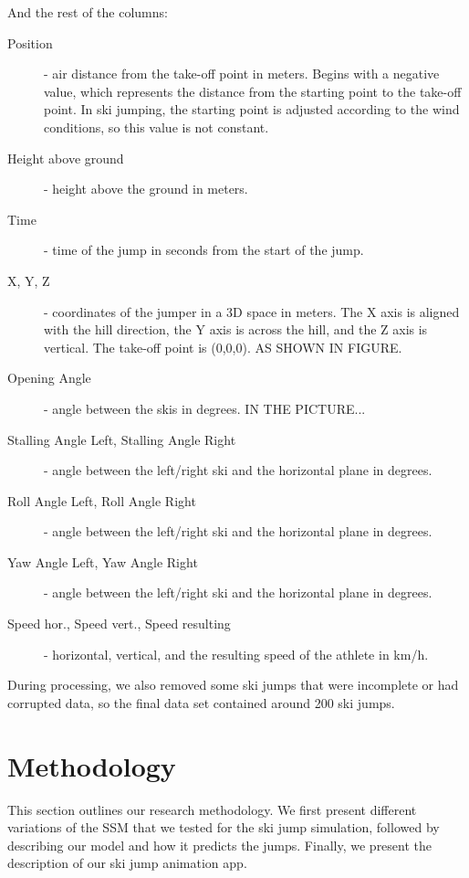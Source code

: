 \documentclass[sigconf,natbib=false, language=english]{acmart}
\begin{document}
And the rest of the columns:
\begin{description}
    \item[Position] - air distance from the take-off point in meters. Begins with a negative value, which
    represents the distance from the starting point to the take-off point. In ski jumping, the starting point
    is adjusted according to the wind conditions, so this value is not constant.
    \item[Height above ground] - height above the ground in meters.
    \item[Time] - time of the jump in seconds from the start of the jump.
    \item[X, Y, Z] - coordinates of the jumper in a 3D space in meters. The X axis is aligned with the hill direction,
    the Y axis is across the hill, and the Z axis is vertical. The take-off point is (0,0,0). AS SHOWN IN FIGURE.
    \item[Opening Angle] - angle between the skis in degrees. IN THE PICTURE...
    \item[Stalling Angle Left, Stalling Angle Right] - angle
    between the left/right ski and the horizontal plane in degrees.
    \item[Roll Angle Left, Roll Angle Right] - angle between the \linebreak left/right ski and the horizontal plane in degrees.
    \item[Yaw Angle Left, Yaw Angle Right] - angle between the \linebreak
    left/right ski and the horizontal plane in degrees.
    \item[Speed hor., Speed vert., Speed resulting] - horizontal,
    vertical, and the resulting speed of the athlete in km/h.
\end{description}


During processing, we also removed some ski jumps that were incomplete or had corrupted data, so the
final data set contained around 200 ski jumps.


\section{Methodology}
\label{sec:method}

This section outlines our research methodology. We first present different variations of the SSM that we tested for the ski jump simulation, followed by describing our model and how it predicts the jumps. Finally, we present the description of our ski jump animation app.
\end{document}
